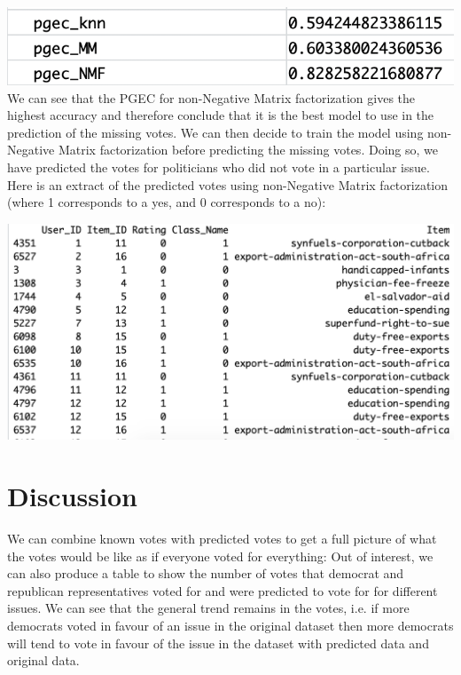 \documentclass{article}
\begin{document}
\includegraphics[scale=0.85]{accuracy_test_problemA.png}
\linebreak
We can see that the PGEC for non-Negative Matrix factorization gives the highest
accuracy and therefore conclude that it is the best model to use in the prediction
of the missing votes. We can then decide to train the model using non-Negative Matrix 
factorization before predicting the missing votes.
\linebreak
Doing so, we have predicted the votes for politicians who did not vote in a
particular issue. Here is an extract of the predicted votes using non-Negative Matrix factorization
(where 1 corresponds to a yes, and 0 corresponds to a no):

\includegraphics[scale=0.5]{prediction_results_problemA.png}

\section{Discussion}

We can combine known votes with predicted votes to get a full picture of what
the votes would be like as if everyone voted for everything:
\linebreak
Out of interest, we can also produce a table to show the number of votes that
democrat and republican representatives voted for and were predicted to vote for
for different issues. We can see that the general trend remains in the votes, i.e. if
more democrats voted in favour of an issue in the original dataset then more democrats will tend 
to vote in favour of the issue in the dataset with predicted data and original data. 
\end{document}
